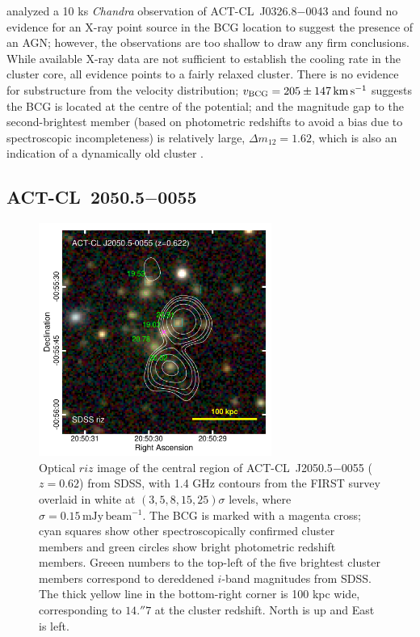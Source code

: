 \cite{gilmour09} analyzed a 10 ks \textit{Chandra} observation of ACT-CL~J0326.8$-$0043 and found no evidence for an X-ray point source in the BCG location to suggest the presence of an AGN; however, the observations are too shallow to draw any firm conclusions. While available X-ray data are not sufficient to establish the cooling rate in the cluster core, all evidence points to a fairly relaxed cluster. There is no evidence for substructure from the velocity distribution; $v_{\rm BCG}=205\pm147\,\mathrm{km\,s^{-1}}$ suggests the BCG is located at the centre of the potential; and the magnitude gap to the second-brightest member (based on photometric redshifts to avoid a bias due to spectroscopic incompleteness) is relatively large, $\Delta m_{12}=1.62$, which is also an indication of a dynamically old cluster \citep[e.g.,][]{wen13}.

\subsection{ACT-CL~2050.5$-$0055}

\begin{figure}
 \centerline{\includegraphics[width=3in]{chapter3/ACT-CL_J20505-0055.pdf}}
\caption{Optical $riz$ image of the central region of ACT-CL~J2050.5$-$0055 ($z=0.62$) from SDSS, 
with 1.4 GHz contours from the FIRST survey overlaid in white at $(3,5,8,15,25)\sigma$ levels, 
where $\sigma=0.15\,\mathrm{mJy\,beam^{-1}}$. The BCG is marked with a magenta cross; cyan squares 
show other spectroscopically confirmed cluster members and green circles show bright photometric 
redshift members. Greeen numbers to the top-left of the five brightest cluster members correspond to dereddened $i$-band magnitudes from SDSS. The thick yellow line in the bottom-right corner is 100 kpc wide, corresponding to $14.\!''7$ at the cluster redshift. North is up and East is left.}
\label{f:J2050}
\end{figure}

